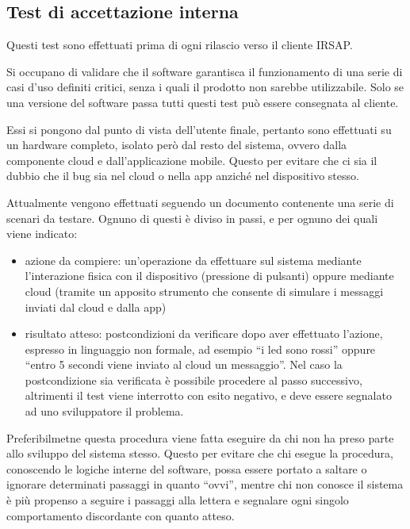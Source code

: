 \documentclass[12pt,a4paper,twoside,titlepage]{book}
\begin{document}
\subsection{Test di accettazione interna}

Questi test sono effettuati prima di ogni rilascio verso il cliente IRSAP.

Si occupano di validare che il software garantisca il funzionamento di una serie di casi d'uso
definiti critici, senza i quali il prodotto non sarebbe utilizzabile.
Solo se una versione del software passa tutti questi test può essere consegnata al cliente.

Essi si pongono dal punto di vista dell'utente finale, pertanto sono effettuati su un
hardware completo, isolato però dal resto del sistema, ovvero dalla componente cloud
e dall'applicazione mobile. Questo per evitare che ci sia il dubbio che il bug sia
nel cloud o nella app anziché nel dispositivo stesso.

Attualmente vengono effettuati seguendo un documento contenente una serie di scenari da testare. 
Ognuno di questi è diviso in passi, e per ognuno dei quali viene indicato:

\begin{itemize}
    \item azione da compiere: un'operazione da effettuare sul sistema mediante l'interazione fisica
        con il dispositivo (pressione di pulsanti) oppure mediante cloud (tramite un apposito
        strumento che consente di simulare i messaggi inviati dal cloud e dalla app)
    \item risultato atteso: postcondizioni da verificare dopo aver effettuato l'azione, espresso in 
        linguaggio non formale, ad esempio ``i led sono rossi'' oppure ``entro 5 secondi viene inviato al cloud un messaggio''.
        Nel caso la postcondizione sia verificata è possibile procedere al passo successivo, altrimenti
        il test viene interrotto con esito negativo, e deve essere segnalato ad uno sviluppatore il problema.
\end{itemize}

Preferibilmetne questa procedura viene fatta eseguire da chi non ha preso parte allo
sviluppo del sistema stesso. Questo per evitare che chi esegue la procedura, conoscendo
le logiche interne del software, possa essere portato a saltare o ignorare determinati
passaggi in quanto ``ovvi'', mentre chi non conosce il sistema è più propenso a seguire
i passaggi alla lettera e segnalare ogni singolo comportamento discordante con quanto
atteso.
\end{document}
